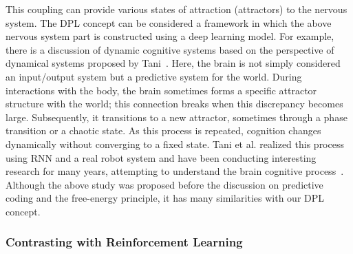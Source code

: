 This coupling can provide various states of attraction (attractors) to the nervous system. The DPL concept can be considered a framework in which the above nervous system part is constructed using a deep learning model. For example, there is a discussion of dynamic cognitive systems based on the perspective of dynamical systems proposed by Tani~\cite{Tani1996model}. Here, the brain is not simply considered an input/output system but a predictive system for the world. During interactions with the body, the brain sometimes forms a specific attractor structure with the world; this connection breaks when this discrepancy becomes large. Subsequently, it transitions to a new attractor, sometimes through a phase transition or a chaotic state. As this process is repeated, cognition changes dynamically without converging to a fixed state. Tani et al. realized this process using RNN and a real robot system and have been conducting interesting research for many years, attempting to understand the brain cognitive process~\cite{tani2016exploring}. Although the above study was proposed before the discussion on predictive coding and the free-energy principle, it has many similarities with our DPL concept.


\subsubsection{Contrasting with Reinforcement Learning}


